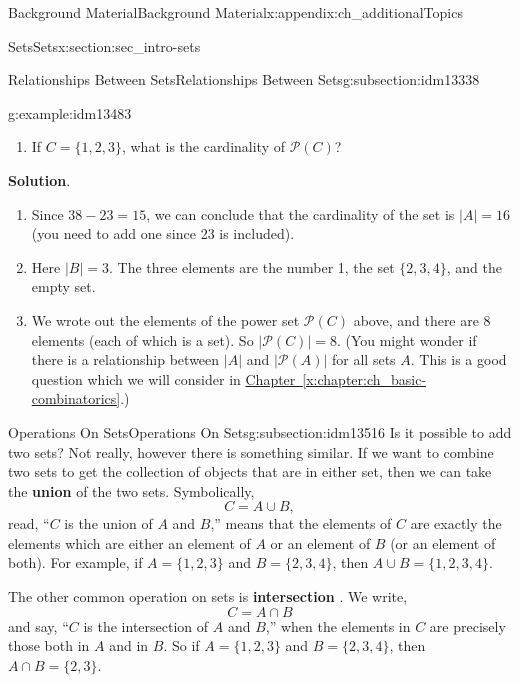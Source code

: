 \documentclass[oneside,10pt,]{book}
\newcommand{\terminology}[1]{\textbf{#1}}
\numberwithin{equation}{chapter}
\def\pow{\mathcal P}
\newcommand{\card}[1]{\left| #1 \right|}
\begin{document}
\begin{appendixptx}{Background Material}{}{Background Material}{}{}{x:appendix:ch_additionalTopics}
\begin{sectionptx}{Sets}{}{Sets}{}{}{x:section:sec_intro-sets}
\begin{subsectionptx}{Relationships Between Sets}{}{Relationships Between Sets}{}{}{g:subsection:idm13338}
\begin{example}{}{g:example:idm13483}
\begin{enumerate}
\item{}If \(C = \{1,2,3\}\), what is the cardinality of \(\pow(C)\)?%
\end{enumerate}
%
\par\smallskip%
\noindent\textbf{Solution}.\hypertarget{g:solution:idm13497}{}\quad{}%
\begin{enumerate}
\item{}Since \(38 - 23 = 15\), we can conclude that the cardinality of the set is \(|A| = 16\) (you need to add one since 23 is included).%
\item{}Here \(|B| = 3\). The three elements are the number 1, the set \(\{2,3,4\}\), and the empty set.%
\item{}We wrote out the elements of the power set \(\pow(C)\) above, and there are 8 elements (each of which is a set). So \(\card{\pow(C)} = 8\).  (You might wonder if there is a relationship between \(\card{A}\) and \(\card{\pow(A)}\) for all sets \(A\).  This is a good question which we will consider in \hyperref[x:chapter:ch_basic-combinatorics]{Chapter~\ref{x:chapter:ch_basic-combinatorics}}.)%
\end{enumerate}
%
\end{example}
\end{subsectionptx}
%
%
\typeout{************************************************}
\typeout{************************************************}
%
\begin{subsectionptx}{Operations On Sets}{}{Operations On Sets}{}{}{g:subsection:idm13516}
Is it possible to add two sets? Not really, however there is something similar. If we want to combine two sets to get the collection of objects that are in either set, then we can take the \terminology{union}  of the two sets. Symbolically,%
\begin{equation*}
C = A \cup B,
\end{equation*}
read, ``\(C\) is the union of \(A\) and \(B\),'' means that the elements of \(C\) are exactly the elements which are either an element of \(A\) or an element of \(B\) (or an element of both). For example, if \(A = \{1, 2, 3\}\) and \(B = \{2, 3, 4\}\), then \(A \cup B = \{1, 2, 3, 4\}\).%
\par
The other common operation on sets is \terminology{intersection} . We write,%
\begin{equation*}
C = A \cap B
\end{equation*}
and say, ``\(C\) is the intersection of \(A\) and \(B\),'' when the elements in \(C\) are precisely those both in \(A\) and in \(B\). So if \(A = \{1, 2, 3\}\) and \(B = \{2, 3, 4\}\), then \(A \cap B = \{2, 3\}\).%

\end{subsectionptx}
\end{sectionptx}
\end{appendixptx}
\end{document}
